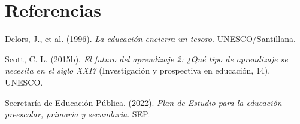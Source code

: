 \documentclass[spanish,letterpaper,oneside]{article}
\begin{document}
\section*{Referencias}
{\setlength{\parskip}{6pt}
\par\hangindent=1.27cm  Delors, J., et al. (1996). \textit{La educación encierra un tesoro}. UNESCO/Santillana.
\par\hangindent=1.27cm  Scott, C. L. (2015b). \textit{El futuro del aprendizaje 2: ¿Qué tipo de aprendizaje se necesita en el siglo XXI?} (Investigación y prospectiva en educación, 14). UNESCO.
\par\hangindent=1.27cm  Secretaría de Educación Pública. (2022). \textit{Plan de Estudio para la educación preescolar, primaria y secundaria}. SEP.
}
\end{document}
